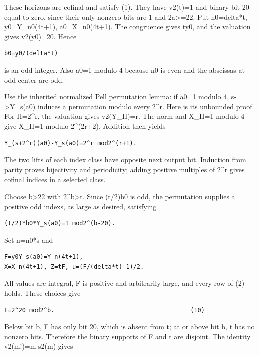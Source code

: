 These horizons are cofinal and satisfy (1). They have v2(t)=1 and binary
bit 20 equal to zero, since their only nonzero bits are 1 and
2a\textgreater=22. Put n0=delta*t, y0=Y\_n0(4t+1), a0=X\_n0(4t+1). The
congruence gives t\textbar y0, and the valuation gives v2(y0)=20. Hence

\begin{verbatim}
b0=y0/(delta*t)
\end{verbatim}

is an odd integer. Also a0=1 modulo 4 because n0 is even and the
abscissas at odd center are odd.

Use the inherited normalized Pell permutation lemma: if a0=1 modulo 4,
s-\textgreater Y\_s(a0) induces a permutation modulo every 2\^{}r. Here
is its unbounded proof. For H=2\^{}r, the valuation gives v2(Y\_H)=r.
The norm and X\_H=1 modulo 4 give X\_H=1 modulo 2\^{}(2r+2). Addition
then yields

\begin{verbatim}
Y_(s+2^r)(a0)-Y_s(a0)=2^r mod2^(r+1).
\end{verbatim}

The two lifts of each index class have opposite next output bit.
Induction from parity proves bijectivity and periodicity; adding
positive multiples of 2\^{}r gives cofinal indices in a selected class.

Choose b\textgreater22 with 2\^{}b\textgreater t. Since (t/2)b0 is odd,
the permutation supplies a positive odd indexs, as large as desired,
satisfying

\begin{verbatim}
(t/2)*b0*Y_s(a0)=1 mod2^(b-20).
\end{verbatim}

Set n=n0*s and

\begin{verbatim}
F=y0Y_s(a0)=Y_n(4t+1),
X=X_n(4t+1), Z=tF, u=(F/(delta*t)-1)/2.
\end{verbatim}

All values are integral, F is positive and arbitrarily large, and every
row of (2) holds. These choices give

\begin{verbatim}
F=2^20 mod2^b.                                      (10)
\end{verbatim}

Below bit b, F has only bit 20, which is absent from t; at or above bit
b, t has no nonzero bits. Therefore the binary supports of F and t are
disjoint. The identity v2(m!)=m-s2(m) gives

